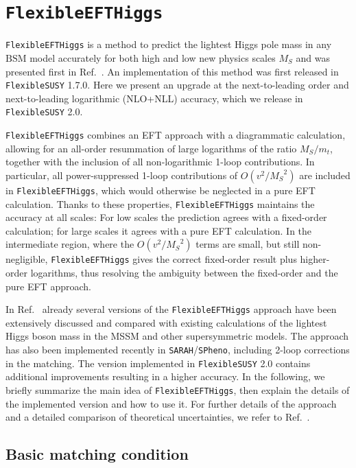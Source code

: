 \documentclass[final,3p,11pt,pdflatex]{elsarticle}
\makeatletter
\newcommand{\sarah}{\texttt{SARAH}\@\xspace}
\newcommand{\spheno}{\texttt{SPheno}\@\xspace}
\newcommand{\fs}{\texttt{FlexibleSUSY}\@\xspace}
\newcommand{\fstwo}{\fs 2.0\@\xspace}
\newcommand{\feft}{\texttt{Flex\-ib\-le\-EFT\-Higgs}\@\xspace}
\newcommand{\BSM}{\ensuremath{\text{BSM}}\xspace}
\newcommand{\MS}{\ensuremath{M_S}\xspace}
\makeatother
\begin{document}
\section{\feft}
\label{sec:feft}

 \feft is a method to predict the lightest Higgs pole mass in any \BSM
 model accurately for both high and low new physics scales $\MS$ and
 was presented first in Ref.~\cite{Athron:2016fuq}.  An implementation
 of this method was first released in \fs 1.7.0.  Here we present an
 upgrade at the next-to-leading order and next-to-leading logarithmic
 (NLO+NLL) accuracy, which we release in \fstwo.

\feft combines an EFT approach with a diagrammatic
calculation, allowing for an all-order resummation of large logarithms
of the ratio $\MS/m_t$, together with the inclusion of all
non-logarithmic 1-loop contributions.  In particular, all
power-suppressed 1-loop contributions of $O(v^2/\MS^2)$ are
included in \feft, which would otherwise be neglected in a pure EFT
calculation.  Thanks to these properties, \feft maintains the accuracy
at all scales: For low scales the prediction agrees with a
fixed-order calculation; for large scales it agrees with a pure EFT
calculation. In the intermediate region, where the $O(v^2/\MS^2)$
terms are small, but still non-negligible, \feft gives the correct
fixed-order result plus higher-order logarithms, thus resolving the
ambiguity between the fixed-order and the pure EFT approach.

In Ref.~\cite{Athron:2016fuq} already several versions of the \feft
approach have been extensively discussed and compared with existing
calculations of the lightest Higgs boson mass in the MSSM and other
supersymmetric models. The approach has also been implemented recently
in \sarah/\spheno \cite{Staub:2017jnp}, including 2-loop corrections in
the matching. The version implemented in  \fstwo contains
additional improvements resulting in a higher accuracy. In the
following, we briefly summarize the main idea of \feft, then explain
the details of the implemented version and how to use it. For further
details of the approach and a detailed comparison of theoretical
uncertainties, we refer to Ref.~\cite{Athron:2016fuq}.

\subsection{Basic matching condition}
\end{document}
